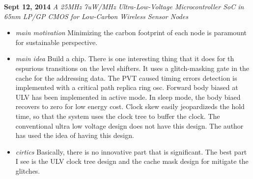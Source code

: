 \documentclass[]{article}
\begin{document}
\noindent \textbf{ Sept 12, 2014}
\textit{A 25MHz 7uW/MHz Ultra-Low-Voltage Microcontroller SoC in 65nm LP/GP CMOS for Low-Carbon Wireless Sensor Nodes}
\indent		\begin{itemize}
            \item \textit{main motivation} Minimizing the carbon footprint of each node is paramount for sustainable perspective.
            
            \item \textit{main idea} Build a chip. There is one interesting thing that it does for th espurious transitions on the level shifters.
            It uses a glitch-masking gate in the cache for the addressing data.
            The PVT caused timing errors detection is implemented with a critical path replica ring osc.
            Forward body biased at ULV has been implemented in active mode.
            In sleep mode, the body biaed recovers to zero for low energy cost.
            Clock skew easily jeopardizeds the hold time, so that the system uses the clock tree to buffer the clock.
            The conventional ultra low voltage design does not have this design.
            The author has used the idea of having this design.

            \item \textit{cirtics}
            Basically, there is no innovative part that is significant. 
            The best part I see is the ULV clock tree design and the cache mask design for mitigate the glitches.
            \end{itemize} 
\end{document}
